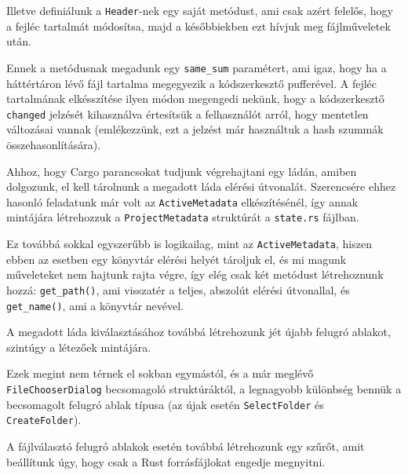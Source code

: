Illetve definiálunk a \texttt{Header}-nek egy saját metódust, ami csak azért felelős,
hogy a fejléc tartalmát módosítsa, majd a későbbiekben ezt hívjuk meg fájlműveletek után.



Ennek a metódusnak megadunk egy \texttt{same\_sum} paramétert, ami igaz,
hogy ha a háttértáron lévő fájl tartalma megegyezik a kódszerkesztő pufferével.
A fejléc tartalmának elkésszítése ilyen módon megengedi nekünk, hogy a kódszerkesztő \texttt{changed}
jelzését kihasználva értesítsük a felhasználót arról, hogy mentetlen változásai vannak
(emlékezzünk, ezt a jelzést már használtuk a hash szummák összehasonlítására).


Ahhoz, hogy Cargo parancsokat tudjunk végrehajtani egy ládán, amiben dolgozunk,
el kell tárolnunk a megadott láda elérési útvonalát.
Szerencsére ehhez hasonló feladatunk már volt az \texttt{ActiveMetadata} elkészítésénél,
így annak mintájára létrehozzuk a \texttt{ProjectMetadata} struktúrát a \texttt{state.rs} fájlban.



Ez továbbá sokkal egyszerűbb is logikailag, mint az \texttt{ActiveMetadata},
hiszen ebben az esetben egy könyvtár elérési helyét tároljuk el, és mi magunk műveleteket
nem hajtunk rajta végre, így elég csak két metódust létrehoznunk hozzá:
\texttt{get\_path()}, ami visszatér a teljes, abszolút elérési útvonallal,
és \texttt{get\_name()}, ami a könyvtár nevével.

A megadott láda kiválasztásához továbbá létrehozunk jét újabb felugró ablakot,
szintúgy a létezőek mintájára.



Ezek megint nem térnek el sokban egymástól, és a már meglévő \texttt{FileChooserDialog} becsomagoló struktúráktól,
a legnagyobb különbség bennük a becsomagolt felugró ablak típusa 
(az újak esetén \texttt{SelectFolder} és \texttt{CreateFolder}).

A fájlválasztó felugró ablakok esetén továbbá létrehozunk egy szűrőt,
amit beállítunk úgy, hogy csak a Rust forrásfájlokat engedje megnyitni.



